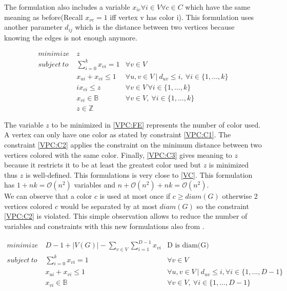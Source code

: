 The formulation also includes a variable $x_{ic} \forall i \in V \forall c \in C$ which have the same meaning as before(Recall $x_{vc}=1$ iff vertex v has color i). This formulation uses another parameter $d_{ij}$ which is the distance between two vertices because knowing the edges is not enough anymore.


\begin{eqnarray}
  minimize\ & z & \label{VPC:FE} \\
  subject\ to & \displaystyle\sum_{i=0}^{k}{x_{vi}} = 1 & \forall v \in V \label{VPC:C1} \\
  &  x_{ui} + x_{vi} \leq 1 & \forall u,v \in V\ |\ d_{uv} \leq i,\ \forall i  \in \{1,\dots,k\} \label{VPC:C2}\\
  &  i x_{vi}  \leq z &  \forall v \in V\, \forall i  \in \{1,\dots,k\}\ \label{VPC:C3}\\
  &  x_{vi} \in \mathbb{B} &  \forall v \in V,\ \forall i  \in \{1,\dots,k\} \label{VPC:C4}\\
  &  z \in \mathbb{Z} &
\end{eqnarray}

The variable $z$ to be minimized in \ref{VPC:FE} represents the number of color used. A vertex can only have one color as stated by constraint \ref{VPC:C1}. The constraint \ref{VPC:C2} applies the constraint on the minimum distance between two vertices colored with the same color. Finally, \ref{VPC:C3} gives meaning to $z$ because it restricts it to be at least the greatest color used but $z$ is minimized thus $z$ is well-defined. This formulations is very close to \ref{VC}. This formulation has $1 + nk = \mathcal{O}(n^2)$ variables and $n + \mathcal{O}(n^2) + nk = \mathcal{O}(n^2)$. \\
We can observe that a color $c$ is used at most once if $c \geq diam(G)$ otherwise 2 vertices colored $c$ would be separated by at most $diam(G)$ so the constraint \ref{VPC:C2} is violated. This simple observation allows to reduce the number of variables and constraints with this new formulations also from \cite{PCModel}.

\begin{eqnarray}
  minimize\ &  D - 1 + |V(G)| - \displaystyle\sum_{v \in V}\displaystyle\sum_{i = 1}^{D-1} x_{vi} & \text{D is diam(G)} \label{VPC2:FE} \\
  subject\ to & \displaystyle\sum_{i=0}^{k}{x_{vi}} = 1 & \forall v \in V \label{VPC2:C1} \\
  &  x_{ui} + x_{vi} \leq 1 & \forall u,v \in V\ |\ d_{uv} \leq i,  \forall i  \in \{1,...,D-1\} \label{VPC2:C2}\\
  &  x_{vi} \in \mathbb{B} &  \forall v \in V,\ \forall i  \in \{1,\dots,D-1\} \label{VPC2:C4}\\
\end{eqnarray}

